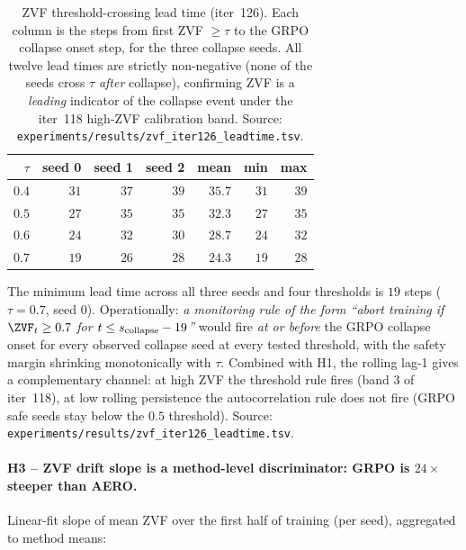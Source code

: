 \begin{table}[htbp]
\centering\small
\setlength{\tabcolsep}{4pt}
\begin{tabular}{rrrrrrr}
\hline
$\tau$ & seed 0 & seed 1 & seed 2 & mean & min & max \\
\hline
$0.4$ & $31$ & $37$ & $39$ & $35.7$ & $31$ & $39$ \\
$0.5$ & $27$ & $35$ & $35$ & $32.3$ & $27$ & $35$ \\
$0.6$ & $24$ & $32$ & $30$ & $28.7$ & $24$ & $32$ \\
$0.7$ & $19$ & $26$ & $28$ & $24.3$ & $19$ & $28$ \\
\hline
\end{tabular}
\caption{ZVF threshold-crossing lead time (iter~126).  Each
column is the steps from first ZVF $\ge\tau$ to the GRPO
collapse onset step, for the three collapse seeds.  All twelve
lead times are strictly non-negative (none of the seeds cross
$\tau$ \emph{after} collapse), confirming ZVF is a \emph{leading}
indicator of the collapse event under the iter~118 high-ZVF
calibration band.  Source:
\texttt{experiments/results/zvf\_iter126\_leadtime.tsv}.}
\label{tab:zvf-iter126-leadtime}
\end{table}

The minimum lead time across all three seeds and four
thresholds is $19$ steps ($\tau{=}0.7$, seed 0).  Operationally:
\textit{a monitoring rule of the form ``abort training if
$\ZVF_t \ge 0.7$ for $t \le s_{\rm collapse}-19$''} would fire
\emph{at or before} the GRPO collapse onset for every observed
collapse seed at every tested threshold, with the safety margin
shrinking monotonically with $\tau$.  Combined with H1, the
rolling lag-1 gives a complementary channel: at high ZVF the
threshold rule fires (band 3 of iter~118), at low rolling
persistence the autocorrelation rule does not fire (GRPO safe
seeds stay below the $0.5$ threshold).  Source:
\texttt{experiments/results/zvf\_iter126\_leadtime.tsv}.

\paragraph{H3 -- ZVF drift slope is a method-level discriminator:
GRPO is $24\times$ steeper than AERO.}
Linear-fit slope of mean ZVF over the first half of training
(per seed), aggregated to method means:


